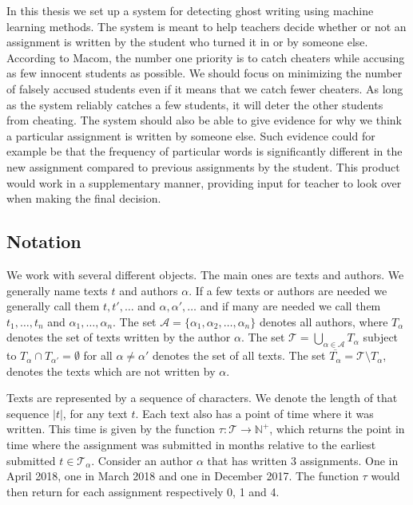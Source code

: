 In this thesis we set up a system for detecting ghost writing using machine
learning methods. The system is meant to help teachers decide whether or not
an assignment is written by the student who turned it in or by someone else.
According to Macom, the number one priority is to catch cheaters while accusing
as few innocent students as possible. We should focus on minimizing the number
of falsely accused students even if it means that we catch fewer cheaters. As
long as the system reliably catches a few students, it will deter the other
students from cheating. The system should also be able to give evidence for why
we think a particular assignment is written by someone else. Such evidence could
for example be that the frequency of particular words is significantly different
in the new assignment compared to previous assignments by the student. This
product would work in a supplementary manner, providing input for teacher to
look over when making the final decision.

\subsection{Notation} \label{subsec:notation}

We work with several different objects. The main ones are texts and authors.
We generally name texts $t$ and authors $\alpha$. If a few texts or authors
are needed we generally call them $t, t', \dots$ and $\alpha, \alpha', \dots$
and if many are needed we call them $t_1, \dots, t_n$ and $\alpha_1, \dots,
\alpha_n$. The set $\mathcal{A} = \{\alpha_1, \alpha_2, \dots, \alpha_n\}$
denotes all authors, where $T_\alpha$ denotes the set of texts written by
the author $\alpha$. The set $\mathcal{T} = \bigcup_{\alpha \in \mathcal{A}}
T_\alpha$ subject to $T_{\alpha} \cap T_{\alpha'} = \emptyset$ for all $\alpha
\neq \alpha'$ denotes the set of all texts. The set $\overline{T_\alpha} =
\mathcal{T} \setminus T_\alpha$, denotes the texts which are not written by
$\alpha$.

Texts are represented by a sequence of characters. We denote the
length of that sequence $|t|$, for any text $t$. Each text also has a point
of time where it was written. This time is given by the function $\tau \colon
\mathcal{T} \rightarrow \mathbb{N}^+$, which returns the point in time where the
assignment was submitted in months relative to the earliest submitted $t \in
\mathcal{T_\alpha}$. Consider an author $\alpha$ that has written 3 assignments.
One in April 2018, one in March 2018 and one in December 2017. The function
$\tau$ would then return for each assignment respectively 0, 1 and 4.

